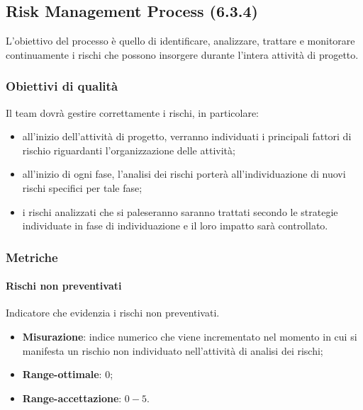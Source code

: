 \subsection{Risk Management Process (6.3.4)}
\label{riskMgmt}
L'obiettivo del processo è quello di identificare, analizzare, trattare e monitorare continuamente i rischi che possono insorgere durante l'intera attività di progetto.
\subsubsection{Obiettivi di qualità}
Il team dovrà gestire correttamente i rischi, in particolare:
\begin{itemize}
\item all'inizio dell'attività di progetto, verranno individuati i principali fattori di rischio riguardanti l'organizzazione delle attività;
\item all'inizio di ogni fase, l'analisi dei rischi porterà all'individuazione di nuovi rischi specifici per tale fase;
\item i rischi analizzati che si paleseranno saranno trattati secondo le strategie individuate in fase di individuazione e il loro impatto sarà controllato.
\end{itemize}
\subsubsection{Metriche}
\paragraph{Rischi non preventivati}
\label{riskNonPrev}
Indicatore che evidenzia i rischi non preventivati.
\begin{itemize}
\item \textbf{Misurazione}: indice numerico che viene incrementato nel momento in cui si manifesta un rischio non individuato nell'attività di analisi dei rischi;
\item \textbf{Range-ottimale}: $0$;
\item \textbf{Range-accettazione}: $0 - 5$.
\end{itemize}
